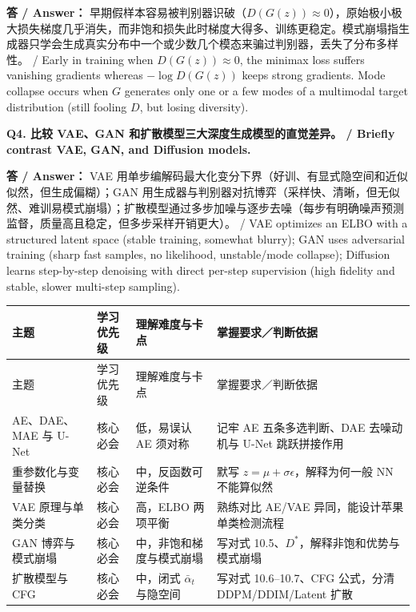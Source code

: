 \textbf{答 / Answer：} 早期假样本容易被判别器识破（$D(G(z))\approx 0$），原始极小极大损失梯度几乎消失，而非饱和损失此时梯度大得多、训练更稳定。模式崩塌指生成器只学会生成真实分布中一个或少数几个模态来骗过判别器，丢失了分布多样性。 / Early in training when $D(G(z))\approx 0$, the minimax loss suffers vanishing gradients whereas $-\log D(G(z))$ keeps strong gradients. Mode collapse occurs when $G$ generates only one or a few modes of a multimodal target distribution (still fooling $D$, but losing diversity).

\textbf{Q4. 比较 VAE、GAN 和扩散模型三大深度生成模型的直觉差异。 / Briefly contrast VAE, GAN, and Diffusion models.}

\textbf{答 / Answer：} VAE 用单步编解码最大化变分下界（好训、有显式隐空间和近似似然，但生成偏糊）；GAN 用生成器与判别器对抗博弈（采样快、清晰，但无似然、难训易模式崩塌）；扩散模型通过多步加噪与逐步去噪（每步有明确噪声预测监督，质量高且稳定，但多步采样开销更大）。 / VAE optimizes an ELBO with a structured latent space (stable training, somewhat blurry); GAN uses adversarial training (sharp fast samples, no likelihood, unstable/mode collapse); Diffusion learns step-by-step denoising with direct per-step supervision (high fidelity and stable, slower multi-step sampling).



\begingroup\small\setlength{\tabcolsep}{3pt}\renewcommand{\arraystretch}{1.22}
\begin{longtable}{@{}>{\raggedright\arraybackslash}p{}>{\raggedright\arraybackslash}p{}>{\raggedright\arraybackslash}p{}>{\raggedright\arraybackslash}p{}@{}}
\toprule
主题 & 学习优先级 & 理解难度与卡点 & 掌握要求／判断依据 \\
\midrule\endfirsthead
主题 & 学习优先级 & 理解难度与卡点 & 掌握要求／判断依据 \\
\midrule\endhead
\bottomrule\endfoot
AE、DAE、MAE 与 U-Net & 核心必会 & 低，易误认 AE 须对称 & 记牢 AE 五条多选判断、DAE 去噪动机与 U-Net 跳跃拼接作用 \\
重参数化与变量替换 & 核心必会 & 中，反函数可逆条件 & 默写 $z=\mu+\sigma\epsilon$，解释为何一般 NN 不能算似然 \\
VAE 原理与单类分类 & 核心必会 & 高，ELBO 两项平衡 & 熟练对比 AE/VAE 异同，能设计苹果单类检测流程 \\
GAN 博弈与模式崩塌 & 核心必会 & 中，非饱和梯度与模式崩塌 & 写对式 10.5、$D^*$，解释非饱和优势与模式崩塌 \\
扩散模型与 CFG & 核心必会 & 中，闭式 $\bar{\alpha}_t$ 与隐空间 & 写对式 10.6–10.7、CFG 公式，分清 DDPM/DDIM/Latent 扩散 \\
\end{longtable}\endgroup


